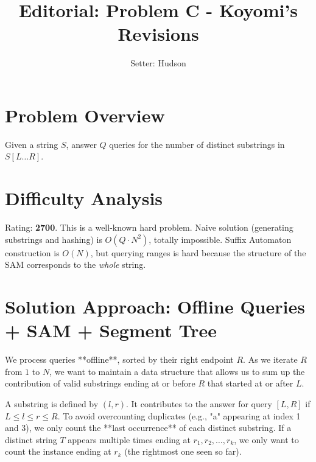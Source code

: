 \documentclass[11pt]{article}
\title{\textbf{Editorial: Problem C - Koyomi's Revisions}}
\author{Setter: Hudson}
\date{}
\begin{document}
\maketitle

\section*{Problem Overview}
Given a string $S$, answer $Q$ queries for the number of distinct substrings in $S[L \dots R]$.

\section*{Difficulty Analysis}
Rating: \textbf{2700}.
This is a well-known hard problem.
Naive solution (generating substrings and hashing) is $O(Q \cdot N^2)$, totally impossible.
Suffix Automaton construction is $O(N)$, but querying ranges is hard because the structure of the SAM corresponds to the \textit{whole} string.

\section*{Solution Approach: Offline Queries + SAM + Segment Tree}
We process queries **offline**, sorted by their right endpoint $R$.
As we iterate $R$ from $1$ to $N$, we want to maintain a data structure that allows us to sum up the contribution of valid substrings ending at or before $R$ that started at or after $L$.

A substring is defined by $(l, r)$. It contributes to the answer for query $[L, R]$ if $L \le l \le r \le R$.
To avoid overcounting duplicates (e.g., "a" appearing at index 1 and 3), we only count the **last occurrence** of each distinct substring.
If a distinct string $T$ appears multiple times ending at $r_1, r_2, \dots, r_k$, we only want to count the instance ending at $r_k$ (the rightmost one seen so far).
\end{document}
